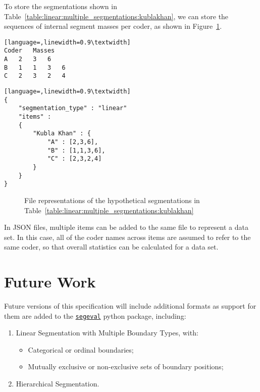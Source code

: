 \documentclass{article}
\begin{document}
To store the segmentations shown in
Table~\ref{table:linear:multiple_segmentations:kublakhan}, we can store the
sequences of internal segment masses per coder, as shown in
Figure~\ref{fig:linear:segmentation:files}.

\newsavebox{\lineartsv}
\begin{lrbox}{\lineartsv}
\begin{minipage}[b]{0.5\textwidth}
\begin{lstlisting}[language=,linewidth=0.9\textwidth]
Coder	Masses
A	2	3	6
B	1	1	3	6
C	2	3	2	4

\end{lstlisting}
\vspace{-2em}
\end{minipage}
\end{lrbox}

\newsavebox{\linearjson}
\begin{lrbox}{\linearjson}
\begin{minipage}[b]{0.5\textwidth}
\begin{lstlisting}[language=,linewidth=0.9\textwidth]
{
	"segmentation_type" : "linear"
	"items" :
	{
		"Kubla Khan" : {
			"A" : [2,3,6],
			"B" : [1,1,3,6],
			"C" : [2,3,2,4]
		}
	}
}
\end{lstlisting}
\vspace{-2em}
\end{minipage}
\end{lrbox}

\begin{figure}[h]
\hspace{1em}
\subfloat[TSV]{\usebox{\lineartsv}}
\subfloat[JSON]{\usebox{\linearjson}}
\caption{File representations of the hypothetical segmentations in Table~\ref{table:linear:multiple_segmentations:kublakhan}}
\label{fig:linear:segmentation:files}
\end{figure}

In JSON files, multiple items can be added to the same file to represent a
data set.  In this case, all of the coder names across items are assumed to
refer to the same coder, so that overall statistics can be calculated for a
data set.


\section{Future Work}
Future versions of this specification will include additional formats as support
for them are added to the \texttt{\href{http://nlp.chrisfournier.ca/software/}{segeval}}
python package, including:
\begin{enumerate}
  \setlength{\itemsep}{0cm}%
  \setlength{\parskip}{0cm}%
  \item Linear Segmentation with Multiple Boundary Types, with:
  \begin{itemize}
    \item Categorical or ordinal boundaries;
    \item Mutually exclusive or non-exclusive sets of boundary positions;
  \end{itemize}
  \item Hierarchical Segmentation.
\end{enumerate}



\end{document}
